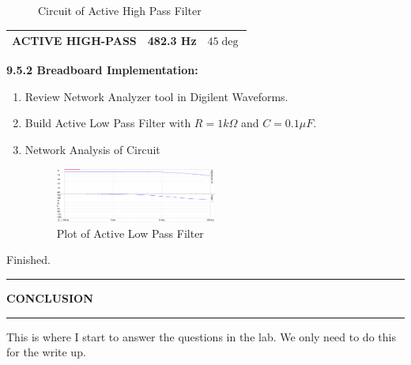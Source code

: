 \documentclass{article}
\begin{document}
\begin{enumerate}
\begin{figure}[H]
        \caption{Circuit of Active High Pass Filter}
    \end{figure}
    \begin{tabular}{|c|c|c|}
        \hline
        ACTIVE HIGH-PASS & 482.3 Hz & $45\deg$ \\
        \hline
        \end{tabular}
\end{enumerate}
\textbf{9.5.2 Breadboard Implementation:}
\begin{enumerate}
    \item Review Network Analyzer tool in Digilent Waveforms.
    \item Build Active Low Pass Filter with $R = 1k \Omega$ and $C = 0.1 \mu F$.
    \item Network Analysis of Circuit
    \begin{figure}[H]
        \centering
        \includegraphics[width=0.5\textwidth]{3physPlot.png}
        \caption{Plot of Active Low Pass Filter}
    \end{figure}
\end{enumerate}
Finished.


\begin{center}
    \hrule
    \vspace{0.2cm}
    \textbf{\large CONCLUSION}
    \vspace{0.2cm}
    \hrule
\end{center}

This is where I start to answer the questions in the lab. We only need to do this for the write up.
\end{document}

